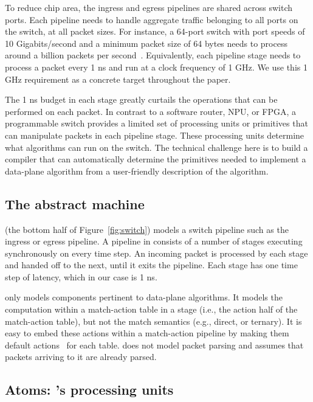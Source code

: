 To reduce chip area, the ingress and egress pipelines are shared across switch
ports.  Each pipeline needs to handle aggregate traffic belonging to all ports
on the switch, at all packet sizes. For instance, a 64-port switch with port
speeds of 10 Gigabits/second and a minimum packet size of 64 bytes needs to
process around a billion packets per second~\cite{rmt}.  Equivalently, each
pipeline stage needs to process a packet every 1 ns and run at a clock
frequency of 1 GHz. We use this 1 GHz requirement as a concrete target
throughout the paper.

The 1 ns budget in each stage greatly curtails the operations that can be
performed on each packet. In contrast to a software router, NPU, or FPGA, a
programmable switch provides a limited set of processing units or primitives
that can manipulate packets in each pipeline stage. These processing units
determine what algorithms can run on the switch. The technical challenge here
is to build a compiler that can automatically determine the primitives needed
to implement a data-plane algorithm from a user-friendly description of the
algorithm.

\subsection{The \absmachine abstract machine}

\absmachine (the bottom half of Figure~\ref{fig:switch}) models a switch
pipeline such as the ingress or egress pipeline. A pipeline in \absmachine
consists of a number of stages executing synchronously on every time step. An
incoming packet is processed by each stage and handed off to the next, until it
exits the pipeline. Each stage has one time step of latency, which in our case
is 1 ns.

\absmachine only models components pertinent to data-plane algorithms. It
models the computation within a match-action table in a stage (i.e., the action
half of the match-action table), but not the match semantics (e.g., direct, or
ternary). It is easy to embed these actions within a match-action pipeline by
making them default actions~\cite{p4spec} for each table. \absmachine does not
model packet parsing and assumes that packets arriving to it are already
parsed.

\subsection{Atoms: \absmachine's processing units}
\label{ss:atoms}

